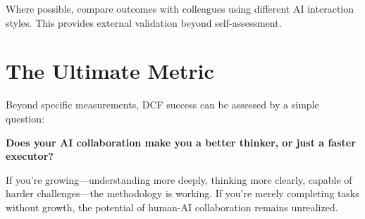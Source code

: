 Where possible, compare outcomes with colleagues using different AI interaction styles. This provides external validation beyond self-assessment.

\section{The Ultimate Metric}

Beyond specific measurements, DCF success can be assessed by a simple question:

\begin{quotebox}
\textbf{Does your AI collaboration make you a better thinker, or just a faster executor?}
\end{quotebox}

If you're growing---understanding more deeply, thinking more clearly, capable of harder challenges---the methodology is working. If you're merely completing tasks without growth, the potential of human-AI collaboration remains unrealized.

